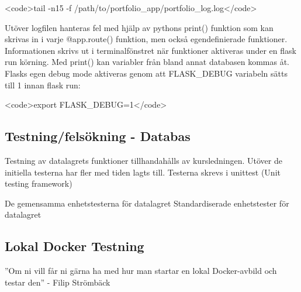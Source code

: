 \documentclass{TDP003mall}
\begin{document}
<code>tail -n15 -f /path/to/portfolio_app/portfolio_log.log</code>

Utöver logfilen hanteras fel med hjälp av pythons print() funktion som kan skrivas in i varje @app.route() funktion, men också egendefinierade funktioner. Informationen skrivs ut i terminalfönstret när funktioner aktiveras under en flask run körning. Med print() kan variabler från bland annat databasen kommas åt. Flasks egen debug mode aktiveras genom att FLASK_DEBUG variabeln sätts till 1 innan flask run:

<code>export FLASK_DEBUG=1</code>

\subsection{Testning/felsökning - Databas}
Testning av datalagrets funktioner tillhandahålls av kursledningen. Utöver de initiella testerna har fler med tiden lagts till. Testerna skrevs i unittest (Unit testing framework)

De gemensamma enhetstesterna för datalagret
Standardiserade enhetstester för datalagret

\subsection{Lokal Docker Testning}
''Om ni vill får ni gärna ha med hur man startar en lokal Docker-avbild och testar den'' - Filip Strömbäck
\end{document}
